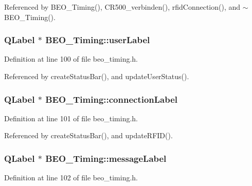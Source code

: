 Referenced by BEO\_\-Timing(), CR500\_\-verbinden(), rfidConnection(), and $\sim$BEO\_\-Timing().\hypertarget{class_b_e_o___timing_7f14795095b944fc64585ec6af1df23a}{
\subsubsection[userLabel]{\setlength{\rightskip}{0pt plus 5cm}QLabel $\ast$ {\bf BEO\_\-Timing::userLabel}}}
\label{class_b_e_o___timing_7f14795095b944fc64585ec6af1df23a}




Definition at line 100 of file beo\_\-timing.h.

Referenced by createStatusBar(), and updateUserStatus().\hypertarget{class_b_e_o___timing_c021ff5e0e3900e27fb3fece4c719238}{
\subsubsection[connectionLabel]{\setlength{\rightskip}{0pt plus 5cm}QLabel $\ast$ {\bf BEO\_\-Timing::connectionLabel}}}
\label{class_b_e_o___timing_c021ff5e0e3900e27fb3fece4c719238}




Definition at line 101 of file beo\_\-timing.h.

Referenced by createStatusBar(), and updateRFID().\hypertarget{class_b_e_o___timing_4d07aaff9e9e351ae75ec2b607157419}{
\subsubsection[messageLabel]{\setlength{\rightskip}{0pt plus 5cm}QLabel $\ast$ {\bf BEO\_\-Timing::messageLabel}}}
\label{class_b_e_o___timing_4d07aaff9e9e351ae75ec2b607157419}




Definition at line 102 of file beo\_\-timing.h.

